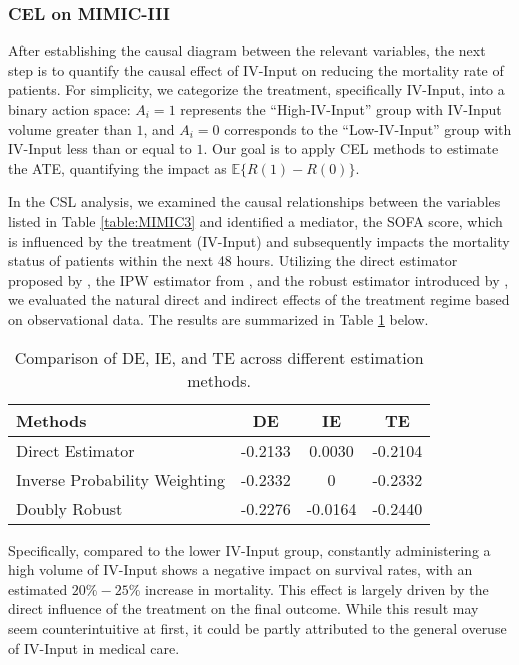 \subsubsection{\acrshort{CEL} on \acrshort{MIMIC-III}}
After establishing the causal diagram between the relevant variables, the next step is to quantify the causal effect of IV-Input on reducing the mortality rate of patients. For simplicity, we categorize the treatment, specifically IV-Input, into a binary action space: $A_i=1$ represents the ``High-IV-Input'' group with IV-Input volume greater than $1$, and $A_i=0$ corresponds to the ``Low-IV-Input'' group with IV-Input less than or equal to $1$. Our goal is to apply \acrshort{CEL} methods to estimate the ATE, quantifying the impact as $\mathbb{E}\{R(1) - R(0)\}$.

In the \acrshort{CSL} analysis, we examined the causal relationships between the variables listed in Table \ref{table:MIMIC3} and identified a mediator, the \acrshort{SOFA} score, which is influenced by the treatment (IV-Input) and subsequently impacts the mortality status of patients within the next 48 hours. Utilizing the direct estimator proposed by \citet{robins1992identifiability}, the IPW estimator from \citet{hong2010ratio}, and the robust estimator introduced by \citet{tchetgen2012semiparametric}, we evaluated the natural direct and indirect effects of the treatment regime based on observational data. The results are summarized in Table \ref{table:mediation_MIMIC3} below.

\begin{table}[ht]
\centering
\begin{tabular}{l|ccc}
\hline
\textbf{Methods}        & \textbf{DE}  & \textbf{IE}  & \textbf{TE}    \\ \hline
{Direct Estimator} & -0.2133 & 0.0030  & -0.2104 \\ \hline
{Inverse Probability Weighting}     & -0.2332 & 0       & -0.2332 \\ \hline
{Doubly Robust}  & -0.2276 & -0.0164 & -0.2440 \\ \hline
\end{tabular}
\caption{Comparison of DE, IE, and TE across different estimation methods.}
\label{table:mediation_MIMIC3}
\end{table}
Specifically, compared to the lower IV-Input group, constantly administering a high volume of IV-Input shows a negative impact on survival rates, with an estimated $20\%-25\%$ increase in mortality. This effect is largely driven by the direct influence of the treatment on the final outcome. While this result may seem counterintuitive at first, it could be partly attributed to the general overuse of IV-Input in medical care. 

